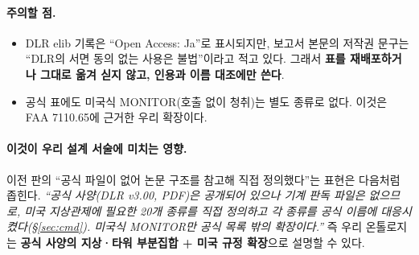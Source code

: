 \documentclass[10pt,a4paper]{article}
\newcommand{\cmd}[1]{\textsf{\small #1}}
\begin{document}
\paragraph{주의할 점.}
\begin{itemize}[leftmargin=12pt]
\item DLR elib 기록은 ``Open Access: Ja''로 표시되지만, 보고서 본문의 저작권 문구는 ``DLR의 서면 동의 없는 사용은 불법''이라고 적고 있다. 그래서 \textbf{표를 재배포하거나 그대로 옮겨 싣지 않고, 인용과 이름 대조에만 쓴다}.
\item 공식 표에도 미국식 \cmd{MONITOR}(호출 없이 청취)는 별도 종류로 없다. 이것은 FAA 7110.65에 근거한 우리 확장이다.
\end{itemize}

\paragraph{이것이 우리 설계 서술에 미치는 영향.}
이전 판의 ``공식 파일이 없어 논문 구조를 참고해 직접 정의했다''는 표현은 다음처럼 좁힌다. \emph{``공식 사양(DLR v3.00, PDF)은 공개되어 있으나 기계 판독 파일은 없으므로, 미국 지상관제에 필요한 20개 종류를 직접 정의하고 각 종류를 공식 이름에 대응시켰다(\S\ref{sec:cmd}). 미국식 MONITOR만 공식 목록 밖의 확장이다.''} 즉 우리 온톨로지는 \textbf{공식 사양의 지상·타워 부분집합 + 미국 규정 확장}으로 설명할 수 있다.

\end{document}
